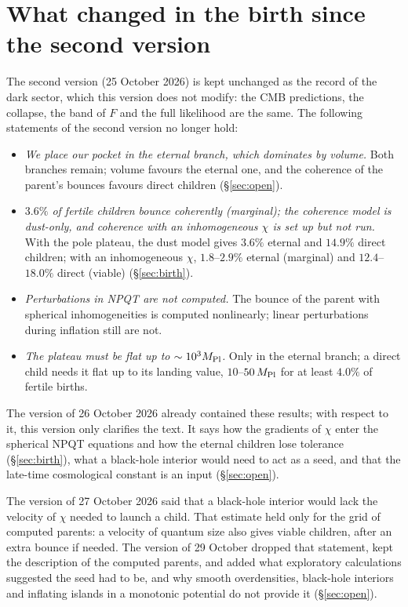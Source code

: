 \documentclass[11pt,a4paper]{article}
\newcommand{\Mpl}{M_{\rm Pl}}
\begin{document}
\section{What changed in the birth since the second version}
\label{sec:changes3}

The second version (25 October 2026) is kept unchanged as the record of the dark sector, which this version does not modify: the CMB predictions, the collapse, the band of $F$ and the full likelihood are the same.
The following statements of the second version no longer hold:
\begin{itemize}
\item \emph{We place our pocket in the eternal branch, which dominates by volume.} Both branches remain; volume favours the eternal one, and the coherence of the parent's bounces favours direct children (\S\ref{sec:open}).
\item \emph{$3.6\%$ of fertile children bounce coherently (marginal); the coherence model is dust-only, and coherence with an inhomogeneous $\chi$ is set up but not run.} With the pole plateau, the dust model gives $3.6\%$ eternal and $14.9\%$ direct children; with an inhomogeneous $\chi$, $1.8$--$2.9\%$ eternal (marginal) and $12.4$--$18.0\%$ direct (viable) (\S\ref{sec:birth}).
\item \emph{Perturbations in NPQT are not computed.} The bounce of the parent with spherical inhomogeneities is computed nonlinearly; linear perturbations during inflation still are not.
\item \emph{The plateau must be flat up to $\sim10^3\Mpl$.} Only in the eternal branch; a direct child needs it flat up to its landing value, $10$--$50\,\Mpl$ for at least $4.0\%$ of fertile births.
\end{itemize}

The version of 26 October 2026 already contained these results; with respect to it, this version only clarifies the text. It says how the gradients of $\chi$ enter the spherical NPQT equations and how the eternal children lose tolerance (\S\ref{sec:birth}), what a black-hole interior would need to act as a seed, and that the late-time cosmological constant is an input (\S\ref{sec:open}).

The version of 27 October 2026 said that a black-hole interior would lack the velocity of $\chi$ needed to launch a child. That estimate held only for the grid of computed parents: a velocity of quantum size also gives viable children, after an extra bounce if needed. The version of 29 October dropped that statement, kept the description of the computed parents, and added what exploratory calculations suggested the seed had to be, and why smooth overdensities, black-hole interiors and inflating islands in a monotonic potential do not provide it (\S\ref{sec:open}).
\end{document}
